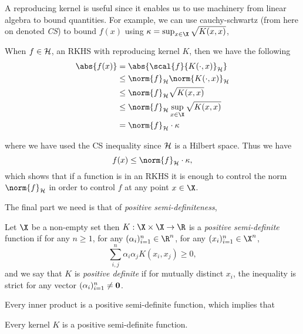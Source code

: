 A reproducing kernel is useful since it enables us to use machinery from linear
algebra to bound quantities. For example, we can use cauchy-schwartz (from here
on denoted \emph{CS}) to bound \(f(x)\) using \(\kappa = \sup_{x \in \X}
\sqrt{K(x, x)}\),
\begin{example}
\label{ex:cs-rkhs-bound-on-fx} When \(f \in \mathcal{H}\), an RKHS with reproducing
kernel \(K\), then we have the following
  \begin{align*} \abs{f(x)} & = \abs{\scal{f}{K(\cdot, x)}_{\rkhs{H}}} \\ & \leq
\norm{f}_{\rkhs{H}} \norm{K(\cdot, x)}_{\rkhs{H}} \\ & \leq \norm{f}_{\rkhs{H}}
\sqrt{K(x, x)} \\ & \leq \norm{f}_{\rkhs{H}} \sup_{x \in \X} \sqrt{K(x, x)} \\ &
= \norm{f}_{\rkhs{H}} \cdot \kappa
  \end{align*}
\end{example} where we have used the CS inequality since \(\mathcal{H}\) is a
Hilbert space. Thus we have
\begin{equation}
\label{eq:cs-rkhs-bound-on-fx} f(x) \leq \norm{f}_{\rkhs{H}} \cdot \kappa,
\end{equation} which shows that if a function is in an RKHS it is enough to
control the norm \(\norm{f}_{\rkhs{H}}\) in order to control \(f\) at any point
\(x \in \X\).

The final part we need is that of \emph{positive semi-definiteness},
\begin{definition}
  \label{def:pos-semi-definite-function} Let \(\X\) be a non-empty set then \(K
: \X \times \X \to \R\) is a \textit{positive semi-definite} function if for any
\(n \geq 1\), for any \((\alpha_i)_{i=1}^n \in \R^n\), for any \((x_i)_{i=1}^n
\in \X^n\),
\begin{equation*} \sum_{i, j}^n \alpha_i \alpha_j K(x_i, x_j) \geq 0,
\end{equation*} and we say that \(K\) is \textit{positive definite} if for
mutually distinct \(x_i\), the inequality is strict for any vector
\((\alpha_i)_{i=1}^n \neq \mathbf{0}\).
\end{definition}

Every inner product is a positive semi-definite function, which implies that
\begin{corollary}
\label{cor:kernels-are-positive-semi-definite} Every kernel \(K\) is a positive
semi-definite function.
\end{corollary}

